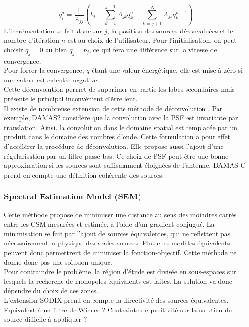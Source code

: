 \begin{equation}
	q_j^n= \frac{1}{A_{jj}}\left(b_j -\sum_{k=1}^{j-1}A_{jk}q_k^{n} - \sum_{k=j+1}^{N}A_{jk}q_k^{n-1} \right)
\end{equation}
L'incrémentation se fait donc sur $j$, la position des sources déconvoluées et le nombre d'itération $n$ est au choix de l'utilisateur. Pour l'initialisation, on peut choisir $q_j=0$ ou bien $q_j=b_j$, ce qui fera une différence sur la vitesse de convergence.\\
Pour forcer la convergence, $q$ étant une valeur énergétique, elle est mise à zéro si une valeur est calculée négative.\\
Cette déconvolution permet de supprimer en partie les lobes secondaires mais présente le principal inconvénient d'être lent.\\

Il existe de nombreuse extension de cette méthode de déconvolution \citep{Dougherty2005}. Par exemple, DAMAS2 considère que la convolution avec la PSF est invariante par translation. Ainsi, la convolution dans le domaine spatial est remplacée par un produit dans le domaine des nombres d'onde. Cette formulation a pour effet d'accélérer la procédure de déconvolution. Elle propose aussi l'ajout d'une régularisation par un filtre passe-bas. Ce choix de PSF peut être une bonne approximation si les sources sont suffisamment éloignées de l'antenne. DAMAS-C prend en compte une définition cohérente des sources.%



 
\subsubsection{Spectral Estimation Model (SEM)}
Cette méthode propose de minimiser une distance au sens des moindres carrés entre les CSM mesurées et estimée, à l'aide d'un gradient conjugué. La minimisation se fait par l'ajout de sources équivalentes, qui ne reflettent pas nécessairement la physique des vraies sources. Plusieurs modèles équivalents peuvent donc permettrent de minimiser la fonction-objectif. Cette méthode ne donne donc pas une solution unique.\\
Pour contraindre le problème, la région d'étude est divisée en sous-espaces sur lesquels la recherche de monopoles équivalents est faites. La solution va donc dépendre du choix de ces zones.
\citep{Blacodon2003}\\
L'extension SODIX prend en compte la directivité des sources équivalentes.
Equivalent à un filtre de Wiener ?
Contrainte de positivité sur la solution de source difficile à appliquer ?



